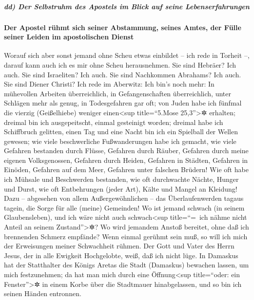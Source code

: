 \hypertarget{dd-der-selbstruhm-des-apostels-im-blick-auf-seine-lebenserfahrungen}{%
\subparagraph{dd) Der Selbstruhm des Apostels im Blick auf seine
Lebenserfahrungen}\label{dd-der-selbstruhm-des-apostels-im-blick-auf-seine-lebenserfahrungen}}

\hypertarget{der-apostel-ruxfchmt-sich-seiner-abstammung-seines-amtes-der-fuxfclle-seiner-leiden-im-apostolischen-dienst}{%
\paragraph{Der Apostel rühmt sich seiner Abstammung, seines Amtes, der
Fülle seiner Leiden im apostolischen
Dienst}\label{der-apostel-ruxfchmt-sich-seiner-abstammung-seines-amtes-der-fuxfclle-seiner-leiden-im-apostolischen-dienst}}

Worauf sich aber sonst jemand ohne Scheu etwas einbildet -- ich rede in
Torheit --, darauf kann auch ich es mir ohne Scheu herausnehmen.
 Sie sind Hebräer? Ich auch. Sie sind Israeliten? Ich
auch. Sie sind Nachkommen Abrahams? Ich auch.  Sie sind
Diener Christi? Ich rede im Aberwitz: Ich bin's noch mehr: In mühevollen
Arbeiten überreichlich, in Gefangenschaften überreichlich, unter
Schlägen mehr als genug, in Todesgefahren gar oft;  von
Juden habe ich fünfmal die vierzig (Geißelhiebe) weniger
einen\textless sup title=``5.Mose 25,3''\textgreater✲ erhalten;
 dreimal bin ich ausgepeitscht, einmal gesteinigt worden;
dreimal habe ich Schiffbruch gelitten, einen Tag und eine Nacht bin ich
ein Spielball der Wellen gewesen;  wie viele
beschwerliche Fußwanderungen habe ich gemacht, wie viele Gefahren
bestanden durch Flüsse, Gefahren durch Räuber, Gefahren durch meine
eigenen Volksgenossen, Gefahren durch Heiden, Gefahren in Städten,
Gefahren in Einöden, Gefahren auf dem Meer, Gefahren unter falschen
Brüdern!  Wie oft habe ich Mühsale und Beschwerden
bestanden, wie oft durchwachte Nächte, Hunger und Durst, wie oft
Entbehrungen (jeder Art), Kälte und Mangel an Kleidung! 
Dazu -- abgesehen von allem Außergewöhnlichen -- das Überlaufenwerden
tagaus tagein, die Sorge für alle (meine) Gemeinden!  Wo
ist jemand schwach (in seinem Glaubensleben), und ich wäre nicht auch
schwach\textless sup title=``=~ich nähme nicht Anteil an seinem
Zustand''\textgreater✲? Wo wird jemandem Anstoß bereitet, ohne daß ich
brennenden Schmerz empfände?  Wenn einmal gerühmt sein
muß, so will ich mich der Erweisungen meiner Schwachheit rühmen.
 Der Gott und Vater des Herrn Jesus, der in alle Ewigkeit
Hochgelobte, weiß, daß ich nicht lüge.  In Damaskus hat
der Statthalter des Königs Aretas die Stadt (Damaskus) bewachen lassen,
um mich festzunehmen;  da hat man mich durch eine
Öffnung\textless sup title=``oder: ein Fenster''\textgreater✲ in einem
Korbe über die Stadtmauer hinabgelassen, und so bin ich seinen Händen
entronnen.

